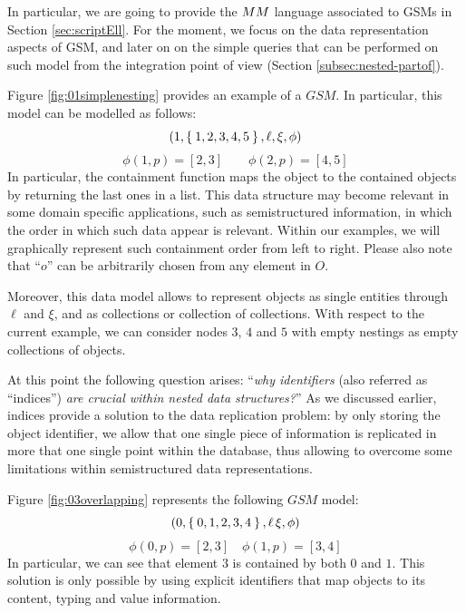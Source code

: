 In particular, we are going to provide the $\metamodel$ language associated to GSMs in Section \vref{sec:scriptEll}. For the moment, we  focus on the data representation aspects of GSM, and later on on the simple queries that can be performed on such model from the integration point of view (Section \vref{subsec:nested-partof}). 

\begin{example}[label=ex:nineteedGSMfrst]
	Figure \ref{fig:01simplenesting} provides an example of a $GSM$. In particular, this model can be modelled as follows:
	\[(1,\Set{1,2,3,4,5},\ell,\xi,\phi)\]
	\[\phi(1,p)=[2,3]\qquad \phi(2,p)=[4,5]\]
	In particular, the containment function maps the object to the contained objects by returning the last ones in a list. This data structure may become
	relevant in some domain specific applications, such as semistructured information, in which the order in which such data appear is relevant. Within our
	examples, we will graphically represent such containment order from left to right. Please also note that ``$o$'' can be arbitrarily chosen from any element in $O$.
	
	Moreover, this data model allows to represent objects as single entities through $\ell$ and $\xi$, and as collections or collection of collections. With respect to the current example, we can consider nodes $3$, $4$ and $5$ with empty nestings as empty collections of objects.
\end{example}

At this point the following question arises: ``\textit{why identifiers} (also referred as ``indices'') \textit{are crucial within nested data structures?}'' As we discussed earlier, indices provide a solution to the data replication problem: by only storing the object identifier, we allow that one single piece of information is replicated in more that one single point within the database, thus allowing to overcome some limitations within semistructured data representations.

\begin{example}[continues=ex:nineteedGSMfrst,label=ex:nineteedGSMsnd]
	Figure \vref{fig:03overlapping} represents the following $GSM$ model:
	\[(0,\Set{0,1,2,3,4},\ell\,\xi,\phi)\]
	\[\phi(0,p)=[2,3]\quad \phi(1,p)=[3,4]\]
	In particular, we can see that element $3$ is contained by both $0$ and $1$. This solution is only possible by using explicit identifiers that map objects to its content, typing and value information.
\end{example}

